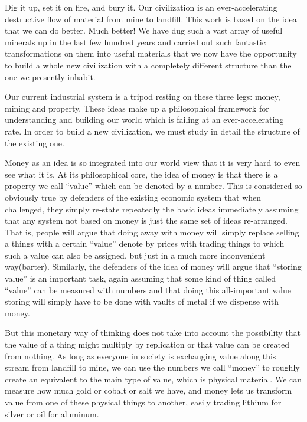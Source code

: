 

Dig it up, set it on fire, and bury it.  Our civilization is an ever-accelerating destructive flow of material from mine to landfill.  This work is based on the idea that we can do better. Much better!  We have dug such a vast array of useful minerals up in the last few hundred years and carried out such fantastic transformations on them into useful materials that we now have the opportunity to build a whole new civilization with a completely different structure than the one we presently inhabit.  

Our current industrial system is a tripod resting on these three legs: money, mining and property.  These ideas make up a philosophical framework for understanding and building our world which is failing at an ever-accelerating rate.  In order to build a new civilization, we must study in detail the structure of the existing one.  
  
Money as an idea is so integrated into our world view that it is very hard to even see what it is.  At its philosophical core, the idea of money is that there is a property we call ``value'' which can be denoted by a number.  This is considered so obviously true by defenders of the existing economic system that when challenged, they simply re-state repeatedly the basic ideas immediately assuming that any system not based on money is just the same set of ideas re-arranged. That is, people will argue that doing away with money will simply replace selling a things with a certain ``value'' denote by prices with trading things to which such a value can also be assigned, but just in a much more inconvenient way(barter). Similarly, the defenders of the idea of money will argue that ``storing value'' is an important task, again assuming that some kind of thing called ``value'' can be measured with numbers and that doing this all-important value storing will simply have to be done with vaults of metal if we dispense with money.  

But this monetary way of thinking does not take into account the possibility that the value of a thing might multiply by replication or that value can be created from nothing.  As long as everyone in society is exchanging value along this stream from landfill to mine, we can use the numbers we call ``money'' to roughly create an equivalent to the main type of value, which is physical material.  We can measure how much gold or cobalt or salt we have, and money lets us transform value from one of these physical things to another, easily trading lithium for silver or oil for aluminum.  


